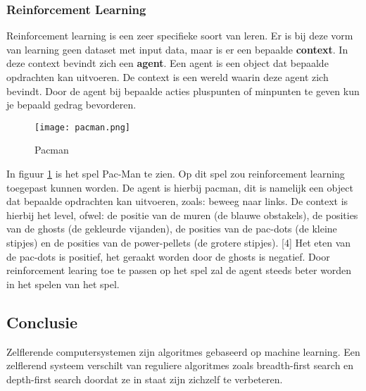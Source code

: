 \subsubsection{Reinforcement Learning}
Reinforcement learning is een zeer specifieke soort van leren. Er is bij deze vorm van learning geen dataset met input data, maar is er een bepaalde \textbf{context}. In deze context bevindt zich een \textbf{agent}. Een agent is een object dat bepaalde opdrachten kan uitvoeren. De context is een wereld waarin deze agent zich bevindt. Door de agent bij bepaalde acties pluspunten of minpunten te geven kun je bepaald gedrag bevorderen.  

\begin{figure}[h]
  \centering
    \texttt{[image: pacman.png]}
  \caption{Pacman}
  \label{fig:Pacman}
\end{figure}

In figuur \ref{fig:Pacman} is het spel Pac-Man te zien. Op dit spel zou reinforcement learning toegepast kunnen worden. De agent is hierbij pacman, dit is namelijk een object dat bepaalde opdrachten kan uitvoeren, zoals: beweeg naar links. De context is hierbij het level, ofwel: de positie van de muren (de blauwe obstakels), de posities van de ghosts (de gekleurde vijanden), de posities van de pac-dots (de kleine stipjes) en de posities van de power-pellets (de grotere stipjes). [4] Het eten van de pac-dots is positief, het geraakt worden door de ghosts is negatief. Door reinforcement learing toe te passen op het spel zal de agent steeds beter worden in het spelen van het spel. 

\subsection{Conclusie}
Zelflerende computersystemen zijn algoritmes gebaseerd op machine learning. Een zelflerend systeem verschilt van reguliere algoritmes zoals breadth-first search en depth-first search doordat ze in staat zijn zichzelf te verbeteren.



